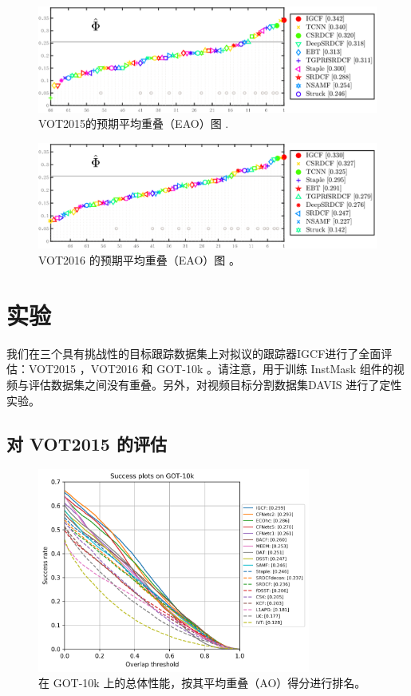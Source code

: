 \begin{figure}[t]
    \centering
    \includegraphics[width=1.0\textwidth]{Img/IGCF/vot/eao_rank_vot2015.png}
    \caption{VOT2015的预期平均重叠（EAO）图 \cite{Kristan2015TheVO}.}
    \label{fig:vot15}
\end{figure}

\begin{figure}[t]
    \centering
    \includegraphics[width=1.0\textwidth]{Img/IGCF/vot/eao_rank_vot2016.png}
    \caption{VOT2016 的预期平均重叠（EAO）图 \cite{Kristan2016TheVO}。}
    \label{fig:vot16}
\end{figure}

\section{实验}
我们在三个具有挑战性的目标跟踪数据集上对拟议的跟踪器IGCF进行了全面评估：VOT2015 \cite{Kristan2015TheVO}，VOT2016 \cite{Kristan2016TheVO} 和 GOT-10k \cite{GOT-10k}。请注意，用于训练 InstMask 组件的视频与评估数据集之间没有重叠。另外，对视频目标分割数据集DAVIS \cite{Perazzi2016}进行了定性实验。
\subsection{对 VOT2015 的评估}

\begin{figure}[t]
    \centering
    \includegraphics[width=0.8\textwidth]{Img/IGCF/got10k/success_plot.png}
    \caption{在 GOT-10k \cite{GOT-10k}上的总体性能，按其平均重叠（AO）得分进行排名。}
    \label{fig:got10k}
\end{figure}

